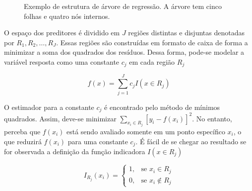 \documentclass[
  12pt,
  a4paper,
]{scrreprt}
\begin{document}
\begin{figure}


\caption{\label{fig-arvore}Exemplo de estrutura de árvore de regressão.
A árvore tem cinco folhas e quatro nós internos.}

\end{figure}%

\vspace{12pt}

O espaço dos preditores é dividido em \(J\) regiões distintas e
disjuntas denotadas por \(R_1, R_2, \dots, R_J\). Essas regiões são
construídas em formato de caixa de forma a minimizar a soma dos
quadrados dos resíduos. Dessa forma, pode-se modelar a variável resposta
como uma constante \(c_j\) em cada região \(R_j\)

\[
f\left(x\right) = \sum^J_{j=1}c_j I\left(x \in R_j \right)
\]

O estimador para a constante \(c_j\) é encontrado pelo método de mínimos
quadrados. Assim, deve-se minimizar
\(\sum_{x_i \in R_j} \left[y_i - f\left(x_i\right)\right]^2\). No
entanto, perceba que \(f\left(x_i\right)\) está sendo avaliado somente
em um ponto específico \(x_i\), o que reduzirá \(f\left(x_i\right)\)
para uma constante \(c_j\). É fácil de se chegar ao resultado se for
observada a definição da função indicadora \(I\left(x \in R_j\right)\)

\[
I_{R_j}(x_i) =
\begin{cases}
    1,& \text{se } x_i \in R_j \\
    0,& \text{se } x_i \notin R_j
\end{cases}
\]
\end{document}
